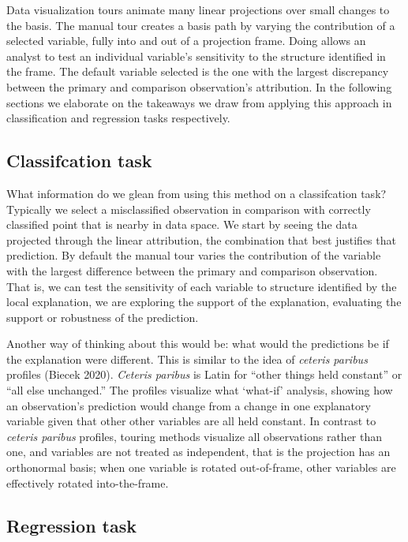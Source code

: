 \documentclass[
]{article}
\begin{document}
Data visualization tours animate many linear projections over small changes to the basis. The manual tour creates a basis path by varying the contribution of a selected variable, fully into and out of a projection frame. Doing allows an analyst to test an individual variable's sensitivity to the structure identified in the frame. The default variable selected is the one with the largest discrepancy between the primary and comparison observation's attribution. In the following sections we elaborate on the takeaways we draw from applying this approach in classification and regression tasks respectively.

\hypertarget{classifcation-task}{%
\subsection{Classifcation task}\label{classifcation-task}}

What information do we glean from using this method on a classifcation task? Typically we select a misclassified observation in comparison with correctly classified point that is nearby in data space. We start by seeing the data projected through the linear attribution, the combination that best justifies that prediction. By default the manual tour varies the contribution of the variable with the largest difference between the primary and comparison observation. That is, we can test the sensitivity of each variable to structure identified by the local explanation, we are exploring the support of the explanation, evaluating the support or robustness of the prediction.

Another way of thinking about this would be: what would the predictions be if the explanation were different. This is similar to the idea of \emph{ceteris paribus} profiles (Biecek 2020). \emph{Ceteris paribus} is Latin for ``other things held constant'' or ``all else unchanged.'' The profiles visualize what `what-if' analysis, showing how an observation's prediction would change from a change in one explanatory variable given that other other variables are all held constant. In contrast to \emph{ceteris paribus} profiles, touring methods visualize all observations rather than one, and variables are not treated as independent, that is the projection has an orthonormal basis; when one variable is rotated out-of-frame, other variables are effectively rotated into-the-frame.

\hypertarget{regression-task}{%
\subsection{Regression task}\label{regression-task}}
\end{document}
